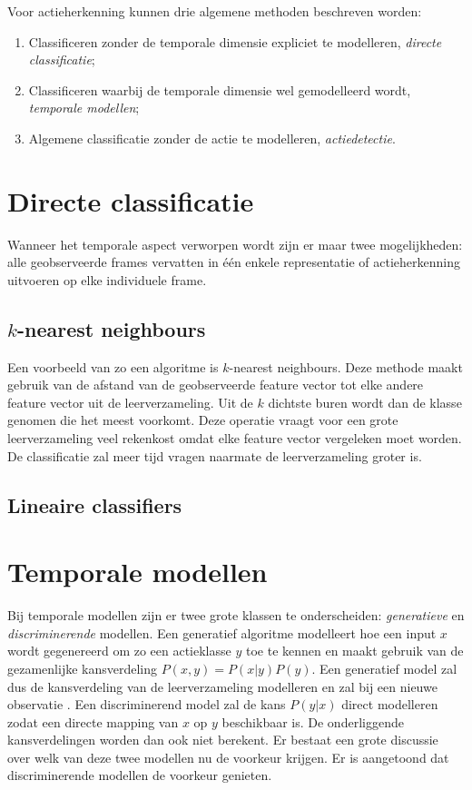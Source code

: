 Voor actieherkenning kunnen drie algemene methoden beschreven worden:
\begin{enumerate}
	\item Classificeren zonder de temporale dimensie expliciet te modelleren, \textit{directe classificatie};
	\item Classificeren waarbij de temporale dimensie wel gemodelleerd wordt, \textit{temporale modellen};
	\item Algemene classificatie zonder de actie te modelleren, \textit{actiedetectie}.
\end{enumerate}


\section{Directe classificatie}
Wanneer het temporale aspect verworpen wordt zijn er maar twee mogelijkheden: alle geobserveerde frames vervatten in één enkele representatie of actieherkenning uitvoeren op elke individuele frame. 

\subsection{$k$-nearest neighbours}

Een voorbeeld van zo een algoritme is $k$-nearest neighbours. Deze methode maakt gebruik van de afstand van de geobserveerde feature vector tot elke andere feature vector uit de leerverzameling. Uit de $k$ dichtste buren wordt dan de klasse genomen die het meest voorkomt. Deze operatie vraagt voor een grote leerverzameling veel rekenkost omdat elke feature vector vergeleken moet worden. De classificatie zal meer tijd vragen naarmate de leerverzameling groter is. 

\subsection{Lineaire classifiers}


\section{Temporale modellen}
\label{subsec:temporale_modellen}
Bij temporale modellen zijn er twee grote klassen te onderscheiden: \textit{generatieve} en \textit{discriminerende} modellen. Een generatief algoritme modelleert hoe een input $x$ wordt gegenereerd om zo een actieklasse $y$ toe te kennen en maakt gebruik van de gezamenlijke kansverdeling $P(x, y) = P(x|y)P(y)$. Een generatief model zal dus de kansverdeling van de leerverzameling modelleren en zal bij een nieuwe observatie . Een discriminerend model zal de kans $P(y|x)$ direct modelleren zodat een directe mapping van $x$ op $y$ beschikbaar is. De onderliggende kansverdelingen worden dan ook niet berekent.
 Er bestaat een grote discussie over welk van deze twee modellen nu de voorkeur krijgen. Er is aangetoond \cite{Andrew2002} dat discriminerende modellen de voorkeur genieten.

